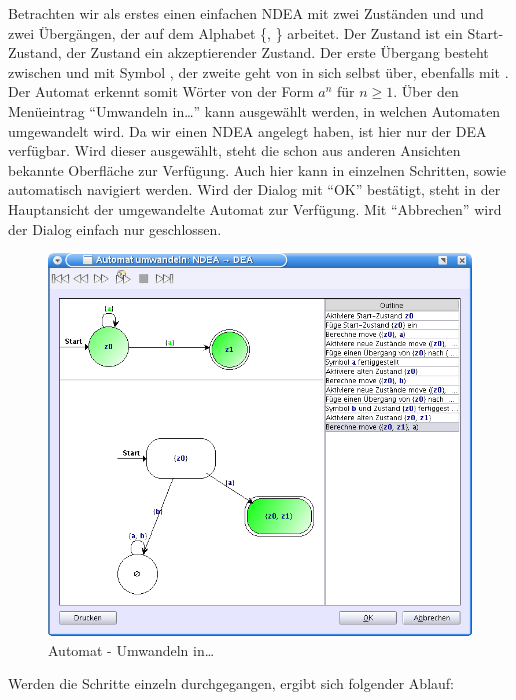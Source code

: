 Betrachten wir als erstes einen einfachen NDEA mit zwei Zuständen  und
 und zwei Übergängen, der auf dem Alphabet \{, \}
arbeitet. Der Zustand  ist ein Start-Zustand, der Zustand 
ein akzeptierender Zustand. Der erste Übergang besteht zwischen  und
 mit Symbol , der zweite geht von  in sich selbst
über, ebenfalls mit . Der Automat erkennt somit Wörter von der Form
$a^n$ für $n \geq 1$. Über den Menüeintrag "`Umwandeln in\ldots"' kann ausgewählt
werden, in welchen Automaten umgewandelt wird. Da wir einen NDEA angelegt haben,
ist hier nur der DEA verfügbar. Wird dieser ausgewählt, steht die schon aus
anderen Ansichten bekannte Oberfläche zur Verfügung. Auch hier kann in einzelnen
Schritten, sowie automatisch navigiert werden. Wird der Dialog mit "`OK"'
bestätigt, steht in der Hauptansicht der umgewandelte Automat zur Verfügung. Mit
"`Abbrechen"' wird der Dialog einfach nur geschlossen.\vspace{10pt}

\begin{figure}[h!]
\begin{center}
\includegraphics[width=12cm]{images/convert_to.png}
\caption{Automat - Umwandeln in\ldots}
\end{center}
\end{figure}

Werden die Schritte einzeln durchgegangen, ergibt sich folgender Ablauf:

